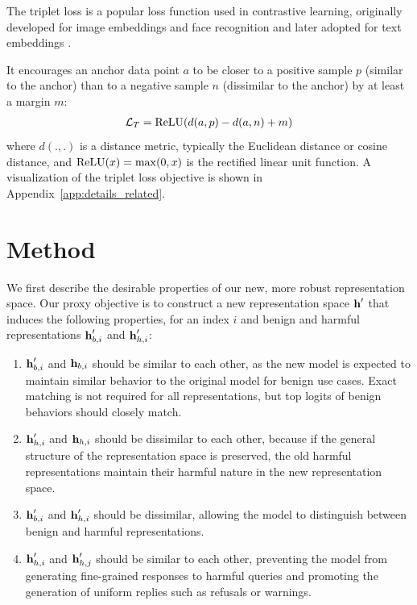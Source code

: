 \documentclass[11pt]{article}
\begin{document}
The triplet loss \citep{Schroff_2015} is a popular loss function used in contrastive learning, originally developed for image embeddings and face recognition and later adopted for text embeddings \citep{reimers2019sentencebertsentenceembeddingsusing}.

It encourages an anchor data point $a$ to be closer to a positive sample $p$ (similar to the anchor) than to a negative sample $n$  (dissimilar to the anchor) by at least a margin $m$:
\begin{align}
	\mathcal{L}_{T} = \text{ReLU}(d(a, p) - d(a, n) + m)
\end{align}
where $d(., .)$ is a distance metric, typically the Euclidean distance or cosine distance, and $\text{ReLU}(x) = \max(0, x)$ is the rectified linear unit function.
A visualization of the triplet loss objective is shown in Appendix~\ref{app:details_related}.

\section{Method}



\newcommand{\dist}{\text{d}}


\newcommand{\gcheck}{\textcolor{darkgreen}{\checkmark}}
\newcommand{\rcross}{\textcolor{darkred}{\ding{55}}}

We first describe the desirable properties of our new, more robust representation space.
Our proxy objective is to construct a new representation space $\textbf{h}^\prime$ that induces the following properties, for an index $i$ and benign and harmful representations $\textbf{h}^\prime_{b,i}$ and $\textbf{h}^\prime_{h,i}$:

\begin{enumerate}
    \item $\textbf{h}^\prime_{b,i}$ and $\textbf{h}_{b,i}$ should be similar to each other, as the new model is expected
    to maintain similar behavior to the original model for benign use cases. Exact matching is not required for all representations, but top logits of benign behaviors should closely match.
  \item $\textbf{h}^\prime_{h,i}$ and $\textbf{h}_{h,i}$ should be dissimilar to each other, because if the general structure of the representation space is preserved, the old harmful representations maintain their harmful nature in the new representation space.
  \item $\textbf{h}^\prime_{b,i}$ and $\textbf{h}^\prime_{h,i}$ should be dissimilar, allowing the model to distinguish between benign and harmful representations.
  \item $\textbf{h}^\prime_{h,i}$ and $\textbf{h}^\prime_{h,j}$ should be similar to each other, preventing the model from generating fine-grained responses to harmful queries and promoting the generation of uniform replies such as refusals or warnings.
\end{enumerate}
\end{document}
